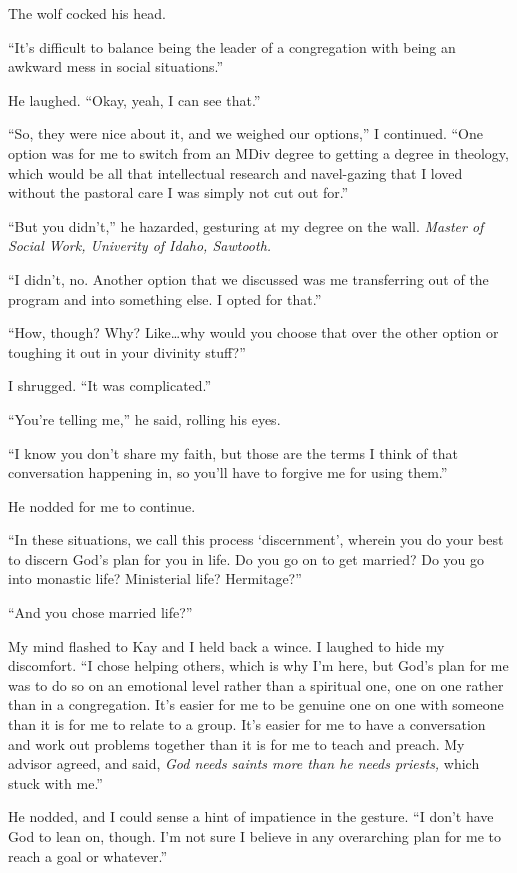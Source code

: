 The wolf cocked his head.

``It's difficult to balance being the leader of a congregation with being an awkward mess in social situations.''

He laughed. ``Okay, yeah, I can see that.''

``So, they were nice about it, and we weighed our options,'' I continued. ``One option was for me to switch from an MDiv degree to getting a degree in theology, which would be all that intellectual research and navel-gazing that I loved without the pastoral care I was simply not cut out for.''

``But you didn't,'' he hazarded, gesturing at my degree on the wall. \emph{Master of Social Work, Univerity of Idaho, Sawtooth.}

``I didn't, no. Another option that we discussed was me transferring out of the program and into something else. I opted for that.''

``How, though? Why? Like\ldots why would you choose that over the other option or toughing it out in your divinity stuff?''

I shrugged. ``It was complicated.''

``You're telling me,'' he said, rolling his eyes.

``I know you don't share my faith, but those are the terms I think of that conversation happening in, so you'll have to forgive me for using them.''

He nodded for me to continue.

``In these situations, we call this process `discernment', wherein you do your best to discern God's plan for you in life. Do you go on to get married? Do you go into monastic life? Ministerial life? Hermitage?''

``And you chose married life?''

My mind flashed to Kay and I held back a wince. I laughed to hide my discomfort. ``I chose helping others, which is why I'm here, but God's plan for me was to do so on an emotional level rather than a spiritual one, one on one rather than in a congregation. It's easier for me to be genuine one on one with someone than it is for me to relate to a group. It's easier for me to have a conversation and work out problems together than it is for me to teach and preach. My advisor agreed, and said, \emph{God needs saints more than he needs priests,} which stuck with me.''

He nodded, and I could sense a hint of impatience in the gesture. ``I don't have God to lean on, though. I'm not sure I believe in any overarching plan for me to reach a goal or whatever.''

